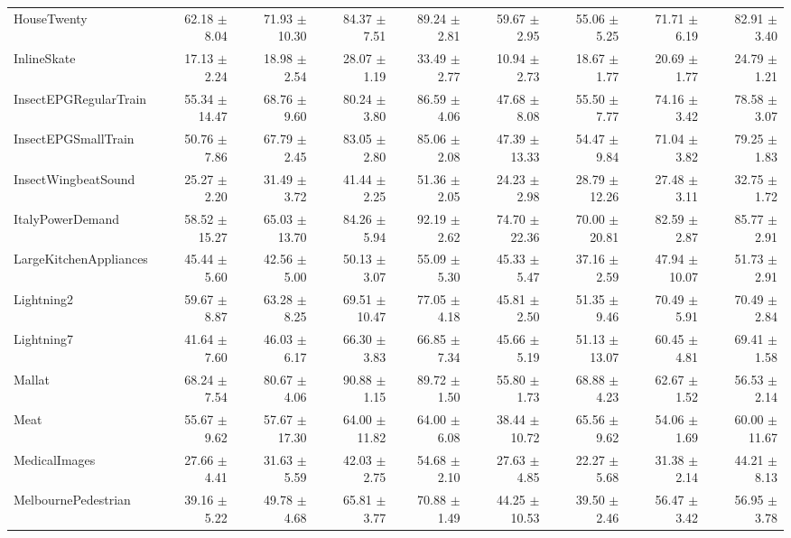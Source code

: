 \begin{landscape}
\begin{longtable}{lrrrrrrrr}
HouseTwenty & 62.18 $\pm$ 8.04 & 71.93 $\pm$ 10.30 & 84.37 $\pm$ 7.51 & 89.24 $\pm$ 2.81 & 59.67 $\pm$ 2.95 & 55.06 $\pm$ 5.25 & 71.71 $\pm$ 6.19 & 82.91 $\pm$ 3.40 \\
InlineSkate & 17.13 $\pm$ 2.24 & 18.98 $\pm$ 2.54 & 28.07 $\pm$ 1.19 & 33.49 $\pm$ 2.77 & 10.94 $\pm$ 2.73 & 18.67 $\pm$ 1.77 & 20.69 $\pm$ 1.77 & 24.79 $\pm$ 1.21 \\
InsectEPGRegularTrain & 55.34 $\pm$ 14.47 & 68.76 $\pm$ 9.60 & 80.24 $\pm$ 3.80 & 86.59 $\pm$ 4.06 & 47.68 $\pm$ 8.08 & 55.50 $\pm$ 7.77 & 74.16 $\pm$ 3.42 & 78.58 $\pm$ 3.07 \\
InsectEPGSmallTrain & 50.76 $\pm$ 7.86 & 67.79 $\pm$ 2.45 & 83.05 $\pm$ 2.80 & 85.06 $\pm$ 2.08 & 47.39 $\pm$ 13.33 & 54.47 $\pm$ 9.84 & 71.04 $\pm$ 3.82 & 79.25 $\pm$ 1.83 \\
InsectWingbeatSound & 25.27 $\pm$ 2.20 & 31.49 $\pm$ 3.72 & 41.44 $\pm$ 2.25 & 51.36 $\pm$ 2.05 & 24.23 $\pm$ 2.98 & 28.79 $\pm$ 12.26 & 27.48 $\pm$ 3.11 & 32.75 $\pm$ 1.72 \\
ItalyPowerDemand & 58.52 $\pm$ 15.27 & 65.03 $\pm$ 13.70 & 84.26 $\pm$ 5.94 & 92.19 $\pm$ 2.62 & 74.70 $\pm$ 22.36 & 70.00 $\pm$ 20.81 & 82.59 $\pm$ 2.87 & 85.77 $\pm$ 2.91 \\
LargeKitchenAppliances & 45.44 $\pm$ 5.60 & 42.56 $\pm$ 5.00 & 50.13 $\pm$ 3.07 & 55.09 $\pm$ 5.30 & 45.33 $\pm$ 5.47 & 37.16 $\pm$ 2.59 & 47.94 $\pm$ 10.07 & 51.73 $\pm$ 2.91 \\
Lightning2 & 59.67 $\pm$ 8.87 & 63.28 $\pm$ 8.25 & 69.51 $\pm$ 10.47 & 77.05 $\pm$ 4.18 & 45.81 $\pm$ 2.50 & 51.35 $\pm$ 9.46 & 70.49 $\pm$ 5.91 & 70.49 $\pm$ 2.84 \\
Lightning7 & 41.64 $\pm$ 7.60 & 46.03 $\pm$ 6.17 & 66.30 $\pm$ 3.83 & 66.85 $\pm$ 7.34 & 45.66 $\pm$ 5.19 & 51.13 $\pm$ 13.07 & 60.45 $\pm$ 4.81 & 69.41 $\pm$ 1.58 \\
Mallat & 68.24 $\pm$ 7.54 & 80.67 $\pm$ 4.06 & 90.88 $\pm$ 1.15 & 89.72 $\pm$ 1.50 & 55.80 $\pm$ 1.73 & 68.88 $\pm$ 4.23 & 62.67 $\pm$ 1.52 & 56.53 $\pm$ 2.14 \\
Meat & 55.67 $\pm$ 9.62 & 57.67 $\pm$ 17.30 & 64.00 $\pm$ 11.82 & 64.00 $\pm$ 6.08 & 38.44 $\pm$ 10.72 & 65.56 $\pm$ 9.62 & 54.06 $\pm$ 1.69 & 60.00 $\pm$ 11.67 \\
MedicalImages & 27.66 $\pm$ 4.41 & 31.63 $\pm$ 5.59 & 42.03 $\pm$ 2.75 & 54.68 $\pm$ 2.10 & 27.63 $\pm$ 4.85 & 22.27 $\pm$ 5.68 & 31.38 $\pm$ 2.14 & 44.21 $\pm$ 8.13 \\
MelbournePedestrian & 39.16 $\pm$ 5.22 & 49.78 $\pm$ 4.68 & 65.81 $\pm$ 3.77 & 70.88 $\pm$ 1.49 & 44.25 $\pm$ 10.53 & 39.50 $\pm$ 2.46 & 56.47 $\pm$ 3.42 & 56.95 $\pm$ 3.78 \\

\end{longtable}
\end{landscape}
